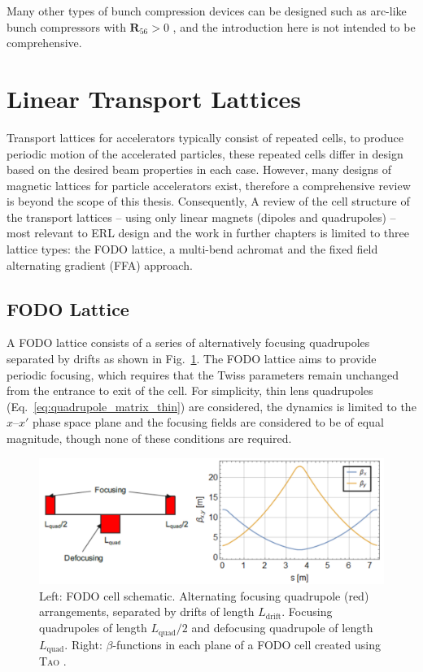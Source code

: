 \documentclass[../main.tex]{subfiles}
\begin{document}
Many other types of bunch compression devices can be designed such as arc-like bunch compressors \cite{williams2020arclike} with $\boldsymbol{R}_{56}>0$ , and the introduction here is not intended to be comprehensive. 

\section{Linear Transport Lattices}

Transport lattices for accelerators typically consist of repeated cells, to produce periodic motion of the accelerated particles, these repeated cells differ in design based on the desired beam properties in each case. However, many designs of magnetic lattices for particle accelerators exist, therefore a comprehensive review is beyond the scope of this thesis. Consequently, A review of the cell structure of the transport lattices -- using only linear magnets (dipoles and quadrupoles) -- most relevant to ERL design and the work in further chapters is limited to three lattice types: the FODO lattice, a multi-bend achromat and the fixed field alternating gradient (FFA) approach.

\subsection{FODO Lattice}
\label{sec:FODO_lattice}

A FODO lattice consists of a series of alternatively focusing quadrupoles separated by drifts as shown in Fig.~\ref{fig:FODO_cell}. The FODO lattice aims to provide periodic focusing, which requires that the Twiss parameters remain unchanged from the entrance to exit of the cell. For simplicity, thin lens quadrupoles (Eq.~\ref{eq:quadrupole_matrix_thin}) are considered, the dynamics is limited to the $x$--$x'$ phase space plane and the focusing fields are considered to be of equal magnitude, though none of these conditions are required.
\begin{figure}[!h]
\centering
\includegraphics[width=\textwidth]{Figures/Energy_Recovery_Linac_Design/FODO_cell_finished.pdf}
\caption{Left: FODO cell schematic. Alternating focusing quadrupole (red) arrangements, separated by drifts of length $L_{\mathrm{drift}}$. Focusing quadrupoles of length $L_{\mathrm{quad}}/2$ and defocusing quadrupole of length $L_{\mathrm{quad}}$. Right: $\beta$-functions in each plane of a FODO cell created using \textsc{Tao} \cite{TaoManual}.}
\label{fig:FODO_cell}
\end{figure}
\end{document}
